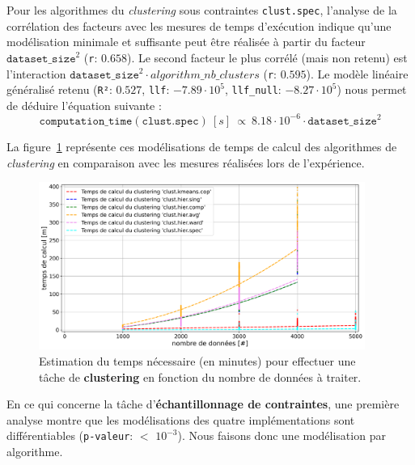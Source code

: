 			Pour les algorithmes du \textit{clustering} sous contraintes \texttt{clust.spec}, l'analyse de la corrélation des facteurs avec les mesures de temps d'exécution indique qu'une modélisation minimale et suffisante peut être réalisée à partir du facteur $\texttt{dataset\_size}^{2}$ (\texttt{r}: $0.658$).
			Le second facteur le plus corrélé (mais non retenu) est l'interaction $\texttt{dataset\_size}^{2} \cdot algorithm\_nb\_clusters$ (\texttt{r}: $0.595$).
			Le modèle linéaire généralisé retenu (\texttt{R²}: $0.527$, \texttt{llf}: $-7.89 \cdot 10^{5}$, \texttt{llf\_null}: $-8.27 \cdot 10^{5}$) nous permet de déduire l'équation suivante :
			\begin{equation}
				\texttt{computation\_time}(\texttt{clust.spec})~[s]~
				\propto~8.18 \cdot 10^{-6} \cdot \texttt{dataset\_size}^{2}
			\end{equation}
			
			La figure~\ref{figure:4.3.2-ETUDE-COUTS-TEMPS-CALCUL-MODELISATION-CLUSTERING} représente ces modélisations de temps de calcul des algorithmes de \textit{clustering} en comparaison avec les mesures réalisées lors de l'expérience.
			\newline
			\begin{figure}[!htb]
				\centering
				\includegraphics[width=0.95\textwidth]{figures/etude-temps-calcul-modelisation-3clust}
				\caption{Estimation du temps nécessaire (en minutes) pour effectuer une tâche de \textbf{clustering} en fonction du nombre de données à traiter.}
				\label{figure:4.3.2-ETUDE-COUTS-TEMPS-CALCUL-MODELISATION-CLUSTERING}
			\end{figure}
			
			
			En ce qui concerne la tâche d'\textbf{échantillonnage de contraintes}, une première analyse montre que les modélisations des quatre implémentations sont différentiables  (\texttt{p-valeur}: $<$ \texttt{$10^{-3}$}). Nous faisons donc une modélisation par algorithme.
			
